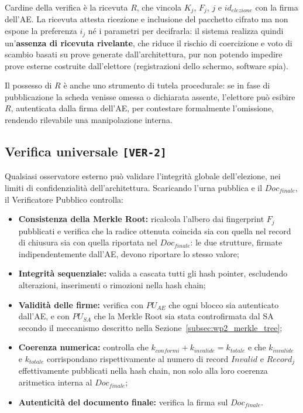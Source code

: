 Cardine della verifica è la ricevuta $R$, che vincola $K_j$, $F_j$, $j$ e $id_{elezione}$ con la firma dell'AE. La ricevuta attesta ricezione e inclusione del pacchetto cifrato ma non espone la preferenza $i_j$ né i parametri per decifrarla: il sistema realizza quindi un'\textbf{assenza di ricevuta rivelante}, che riduce il rischio di coercizione e voto di scambio basati su prove generate dall'architettura, pur non potendo impedire prove esterne costruite dall'elettore (registrazioni dello schermo, software spia).

Il possesso di $R$ è anche uno strumento di tutela procedurale: se in fase di pubblicazione la scheda venisse omessa o dichiarata assente, l'elettore può esibire $R$, autenticata dalla firma dell'AE, per contestare formalmente l'omissione, rendendo rilevabile una manipolazione interna.


\subsection{Verifica universale \texttt{[VER-2]}}
\label{subsec:wp2_verifica_universale}

Qualsiasi osservatore esterno può validare l'integrità globale dell'elezione, nei limiti di confidenzialità dell'architettura. Scaricando l'urna pubblica e il $Doc_{finale}$, il Verificatore Pubblico controlla:
\begin{itemize}
    \item \textbf{Consistenza della Merkle Root:} ricalcola l'albero dai fingerprint $F_j$ pubblicati e verifica che la radice ottenuta coincida sia con quella nel record di chiusura sia con quella riportata nel $Doc_{finale}$: le due strutture, firmate indipendentemente dall'AE, devono riportare lo stesso valore;
    \item \textbf{Integrità sequenziale:} valida a cascata tutti gli hash pointer, escludendo alterazioni, inserimenti o rimozioni nella hash chain;
    \item \textbf{Validità delle firme:} verifica con $PU_{AE}$ che ogni blocco sia autenticato dall'AE, e con $PU_{SA}$ che la Merkle Root sia stata controfirmata dal SA secondo il meccanismo descritto nella Sezione~\ref{subsec:wp2_merkle_tree};
    \item \textbf{Coerenza numerica:} controlla che $k_{conformi} + k_{invalide} = k_{totale}$ e che $k_{invalide}$ e $k_{totale}$ corrispondano rispettivamente al numero di record $Invalid$ e $Record_j$ effettivamente pubblicati nella hash chain, non solo alla loro coerenza aritmetica interna al $Doc_{finale}$;
    \item \textbf{Autenticità del documento finale:} verifica la firma sul $Doc_{finale}$.
\end{itemize}

